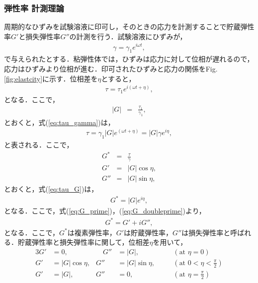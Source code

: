 \subsubsection{弾性率 計測理論}
周期的なひずみを試験溶液に印可し，そのときの応力を計測することで貯蔵弾性率$G'$と損失弾性率$G''$の計測を行う．試験溶液にひずみが，
\begin{eqnarray}
    \gamma=\gamma_1e^{i\omega{}t} ,
\end{eqnarray}
で与えられたとする．粘弾性体では，ひずみは応力に対して位相が遅れるので，応力はひずみより位相が進む．印可されたひずみと応力の関係をFig.\ref{fig:elastcity}に示す．位相差を$\eta$とすると，
\begin{eqnarray}
    \tau=\tau_1e^{i\left(\omega{}t+\eta\right)} ,
    \label{eq:tau_gamma}
\end{eqnarray}
となる．ここで，
\begin{eqnarray}
    |G| &=& \frac{\tau_1}{\gamma_1} ,
\end{eqnarray}
とおくと，式(\ref{eq:tau_gamma})は，
\begin{eqnarray}
    \tau=\gamma_1|G|e^{\left(\omega{}t+\eta\right)}=|G|\gamma{}e^{i\eta} ,
    \label{eq:tau_G}
\end{eqnarray}
と表される．ここで，
\begin{eqnarray}
    G^* &=& \frac{\tau}{\gamma}\\
    G' &=& |G|\cos\eta ,\label{eq:G_prime}\\
    G'' &=& |G|\sin\eta ,\label{eq:G_doubleprime}
\end{eqnarray}
とおくと，式(\ref{eq:tau_G})は，
\begin{eqnarray}
    G^* = |G|e^{i\eta} ,
    \label{eq:G_star}
\end{eqnarray}
となる．ここで，式(\ref{eq:G_prime})，(\ref{eq:G_doubleprime})より，
\begin{eqnarray}
    G^* = G'+iG'' ,
\end{eqnarray}
となる．ここで，$G^*$は複素弾性率，$G'$は貯蔵弾性率，$G''$は損失弾性率と呼ばれる\cite{生物レオロジー}\cite{化学者のためのレオロジー}．貯蔵弾性率と損失弾性率に関して，位相差$\eta$を用いて，
\begin{alignat}{3}
    G' & = 0 ,           & \quad G'' & = |G| ,         & \quad & \left(\text{at } \eta=0\right)               \label{eq:G_case1} \\
    G' & = |G|\cos\eta , & G''       & = |G|\sin\eta , &       & \left(\text{at } 0<\eta<\frac{\pi}{2}\right) \label{eq:G_case2} \\
    G' & = |G| ,         & G''       & = 0 ,           &       & \left(\text{at } \eta=\frac{\pi}{2}\right)   \label{eq:G_case3}
\end{alignat}
